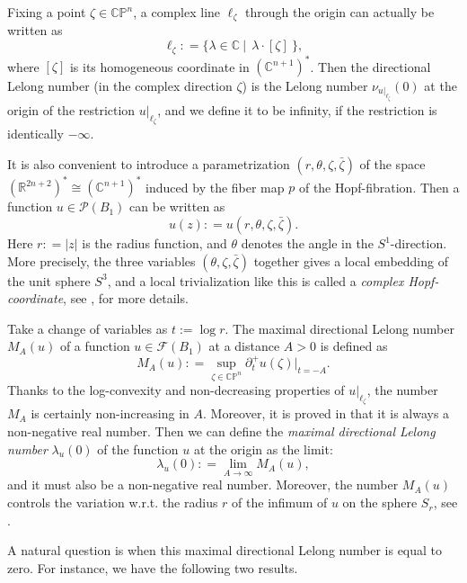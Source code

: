 \documentclass[a4paper,11pt]{amsart}
\numberwithin{equation}{section}
\def\d{\partial}
\def\cP{{\mathcal P}}
\def\cF{{\mathcal F}}
\def\cP{{\mathcal P}}
\def\bC{{\mathbb C}}
\def\bR{{\mathbb R}}
\def\bP{{\mathbb P}}
\def\z{{\zeta}}
\def\l{{\ell}}
\begin{document}
Fixing a point $\z\in \bC\bP^n$,
a complex line $\l_{\z}$ through the origin can actually be written as 
$$\l_{\z}: = \{\lambda\in \bC \ |  \ \  \lambda\cdot [\z] \ \}, $$
where $[\z]$ is its homogeneous coordinate in $(\bC^{n+1})^*$. 
Then the directional Lelong number (in the complex direction $\z$) is 
the Lelong number $\nu_{u|_{\l_\z}}(0)$ 
at the origin of the restriction $u|_{\l_\z}$, 
and we define it to be infinity, if the restriction is identically $-\infty$. 

It is also convenient to introduce a parametrization $(r, \theta, \z, \bar\z)$
of the space $(\bR^{2n+2})^*\cong (\bC^{n+1})^*$ induced by the fiber map $p$ of the Hopf-fibration. 
Then a function $u\in\cP(B_1)$ can be written as 
$$ u(z): = u(r, \theta, \z, \bar\z). $$
Here $r: = |z|$ is the radius function, and $\theta$ denotes the angle in the $S^1$-direction. 
More precisely, 
the three variables $(\theta, \z, \bar\z)$ together gives a local embedding of the unit sphere $S^3$,  
and a local trivialization like this is called a \emph{complex Hopf-coordinate}, see \cite{Li23}, \cite{HLX} for more details.  


Take a change of variables as $t:=\log r$. 
The maximal directional Lelong number $M_A(u)$ 
of a function $u\in \cF(B_1)$ at a distance $A>0$ is defined as 
\begin{equation}
 M_A(u): = \sup_{\z\in \bC\bP^n} \d^+_t u (\z)|_{t = -A}.   
 \end{equation}
Thanks to the log-convexity and non-decreasing properties of $u|_{\l_{\z}}$,
the number $M_A$ is certainly non-increasing in $A$. 
Moreover, it is proved in \cite{Li23} that 
it is always a non-negative real number. 
Then we can define the \emph{maximal directional Lelong number} $\lambda_u(0)$
of the function $u$ at the origin as the  limit: 
\begin{equation}
\lambda_u(0): = \lim_{A\rightarrow \infty} M_A(u), 
\end{equation}
and it must also be a non-negative real number. 
Moreover, the number $M_A(u)$ controls the variation w.r.t. the radius $r$ 
of the infimum of $u$ on the sphere $S_r$, see \cite{HLX}. 

A natural question is when 
this maximal directional Lelong 
number is equal to zero.  
For instance, we have the following two results. 
\end{document}
